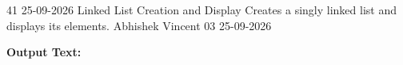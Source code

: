 \clearpage
\label{prog:41}
\programhead
  {41}
  {25-09-2026}
  {Linked List Creation and Display}
  {Creates a singly linked list and displays its elements.}
  {Abhishek Vincent}
  {03}
  {25-09-2026}

\divider
\textbf{Output Text:}\par
\vspace{2pt}

